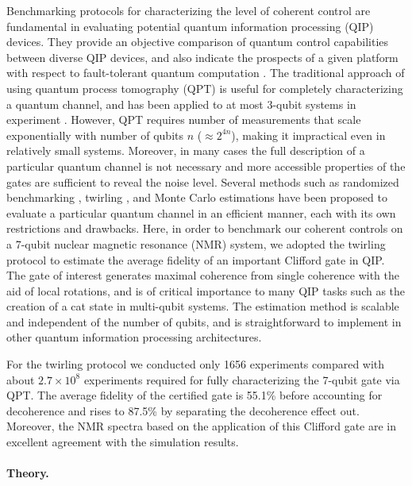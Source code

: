 \documentclass[prl,twocolumn,showpacs]{revtex4-1}
\newcommand{\R}[1]{{\color{red}#1}}
\begin{document}
Benchmarking protocols for characterizing the level of coherent control are  fundamental  in evaluating potential quantum information processing (QIP) devices. They  provide an objective  comparison of quantum control capabilities between diverse QIP devices, and also indicate the prospects of a  given platform  with respect to  fault-tolerant quantum computation \cite{Preskill1998}. The traditional approach of  using  quantum process tomography (QPT) \cite{Chuang1997,Poyatos1997} is useful for completely characterizing  a quantum channel, and has been applied to at most 3-qubit systems in experiment \cite{Childs2001,Weinstein2004,Brien2004,Riebe2006,Chow2009,Bialczak2010,Kim2014,Feng2013}. However, QPT  requires number of measurements that scale exponentially with  number of qubits $n$ ($\approx2^{4n}$), making it impractical  even in relatively small systems. Moreover, in many cases the full description  of a particular quantum channel  is not necessary and more accessible properties   of the gates are sufficient to reveal the noise level.  Several methods such as randomized benchmarking \cite{Emerson2005,Knill2008,Ryan2009}, twirling \cite{Emerson2007,Dankert2009,Moussa2012}, and Monte Carlo estimations \cite{Flammia2011,Silva2011} have been proposed to evaluate a particular quantum channel in an efficient manner, each with its  own restrictions and drawbacks. Here, in order to benchmark our coherent controls on a 7-qubit nuclear magnetic resonance (NMR) system, we adopted the twirling protocol \cite{Moussa2012} to estimate the average fidelity of an important Clifford gate in QIP. The gate of  interest  generates   maximal coherence from single coherence with the aid of  local rotations, and is  of critical importance to many QIP tasks such as the creation of a cat state in multi-qubit systems. The estimation method is scalable and independent of the number of qubits, and is straightforward to implement in other quantum information processing architectures.

For the twirling protocol we conducted only 1656 experiments compared with about $2.7\times 10^8$ experiments required for fully characterizing the 7-qubit gate via QPT.  The average fidelity of the certified gate is 55.1\% before accounting for decoherence and rises to 87.5\% by separating the decoherence effect out. Moreover, the NMR spectra based on the application of this Clifford gate are in excellent agreement with the simulation results.

\paragraph*{Theory.}
\end{document}
